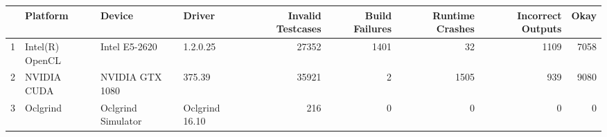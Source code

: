 \begin{tabular}{llllrrrrr}
\toprule
{} &         Platform &              Device &          Driver &  Invalid Testcases &  Build Failures &  Runtime Crashes &  Incorrect Outputs &  Okay \\
\midrule
1 &  Intel(R) OpenCL &       Intel E5-2620 &        1.2.0.25 &              27352 &            1401 &               32 &               1109 &  7058 \\
2 &      NVIDIA CUDA &     NVIDIA GTX 1080 &          375.39 &              35921 &               2 &             1505 &                939 &  9080 \\
3 &         Oclgrind &  Oclgrind Simulator &  Oclgrind 16.10 &                216 &               0 &                0 &                  0 &     0 \\
\bottomrule
\end{tabular}
